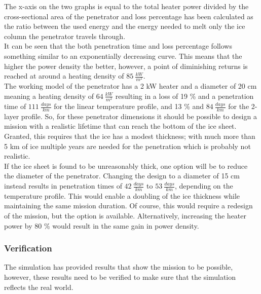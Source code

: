 \noindent
The x-axis on the two graphs is equal to the total heater power divided by the cross-sectional area of the penetrator and loss percentage has been calculated as the ratio between the used energy and the energy needed to melt only the ice column the penetrator travels through. \\

\noindent
It can be seen that the both penetration time and loss percentage follows something similar to an exponentially decreasing curve. This means that the higher the power density the better, however, a point of diminishing returns is reached at around a heating density of $\SI{85}{\frac{kW}{m^2}}$. \\

\noindent
The working model of the penetrator has a 2 kW heater and a diameter of 20 cm meaning a heating density of $\SI{64}{\frac{kW}{m^2}}$ resulting in a loss of 19 \% and a penetration time of $\SI{111}{\frac{days}{km}}$ for the linear temperature profile, and 13 \% and $\SI{84}{\frac{days}{km}}$ for the 2-layer profile. So, for these penetrator dimensions it should be possible to design a mission with a realistic lifetime that can reach the bottom of the ice sheet. Granted, this requires that the ice has a modest thickness; with much more than 5 km of ice multiple years are needed for the penetration which is probably not realistic.\\

\noindent
If the ice sheet is found to be unreasonably thick, one option will be to reduce the diameter of the penetrator. Changing the design to a diameter of 15 cm instead results in penetration times of $\SI{42}{\frac{days}{km}}$ to $\SI{53}{\frac{days}{km}}$, depending on the temperature profile. This would enable a doubling of the ice thickness while maintaining the same mission duration. Of course, this would require a redesign of the mission, but the option is available. Alternatively, increasing the heater power by 80 \% would result in the same gain in power density. 

\subsubsection{Verification}
The simulation has provided results that show the mission to be possible, however, these results need to be verified to make sure that the simulation reflects the real world.\\


